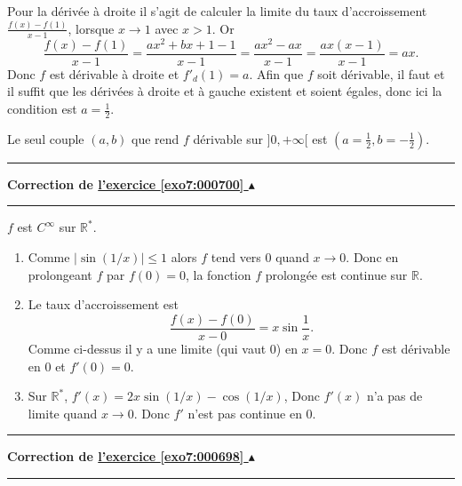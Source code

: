 \documentclass[11pt,a4paper]{article}
\newcommand{\Rr}{\mathbb{R}} \newcommand{\R}{\mathbb{R}}
\newcounter{exo}
\newcommand{\correction}[1]{\hypertarget{cor7:#1}{}\label{cor7:#1}{\bf Correction de \hyperlink{exo7:#1}{l'exercice \ref{exo7:#1} $\blacktriangle$}}\vspace{1mm}\hrule\vspace{1mm}}
\newcommand{\fincorrection}{\vspace{1mm}\hrule\vspace*{7mm}}
\begin{document}
Pour la dérivée à droite il s'agit de calculer la limite du taux d'accroissement
$\frac{f(x)-f(1)}{x-1}$, lorsque $x \to 1$ avec $x>1$.
Or 
$$
\frac{f(x)-f(1)}{x-1} = \frac{ax^2+bx+1 - 1}{x-1} = \frac{ax^2-ax}{x-1} = \frac{ax(x-1)}{x-1} = ax.
$$
Donc $f$ est dérivable à droite et $f'_d(1) = a$.
Afin que $f$ soit dérivable, il faut et il suffit que les dérivées à droite et à gauche
existent et soient égales, donc ici la condition est $a=\frac 12$.


Le seul couple $(a,b)$ que rend $f$ dérivable sur $]0,+\infty[$ 
est $(a=\frac 12, b= -\frac 12)$.
\fincorrection
\correction{000700}
$f$ est $C^\infty$ sur $\Rr^*$.
\begin{enumerate}
  \item Comme $|\sin (1/x)| \leq 1$ alors
$f$ tend vers $0$ quand $x\rightarrow 0$. Donc en prolongeant $f$ par $f(0) =0$,
la fonction  $f$ prolongée est continue sur $\Rr$.
  \item Le taux d'accroissement est
$$\frac{f(x)-f(0)}{x-0}= x \sin\frac{1}{x}.$$
Comme ci-dessus il y a une limite (qui vaut $0$) en $x=0$.
Donc $f$ est d\'erivable en $0$ et $f'(0)=0$.
  \item Sur $\Rr^*$, $f'(x) = 2x\sin (1/x) -\cos(1/x)$,
Donc $f'(x)$ n'a pas de limite quand $x\rightarrow 0$.
Donc $f'$ n'est pas continue en $0$.
\end{enumerate}
\fincorrection
\correction{000698}
\end{document}
